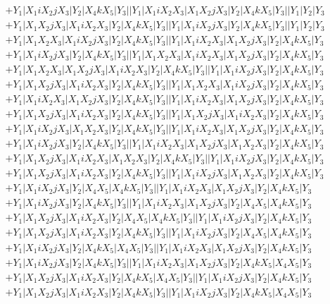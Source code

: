 \documentclass{article}[12pt]
\begin{document}
\begin{align*}
 & +Y_1|X_1iX_2jX_3|Y_2|X_4kX_5|Y_3||Y_1|X_1iX_2X_3|X_1X_2jX_3|Y_2|X_4kX_5|Y_3||Y_1|Y_2|Y_3\\ 
 & +Y_1|X_1X_2jX_3|X_1iX_2X_3|Y_2|X_4kX_5|Y_3||Y_1|X_1iX_2jX_3|Y_2|X_4kX_5|Y_3||Y_1|Y_2|Y_3\\ 
 & +Y_1|X_1X_2X_3|X_1iX_2jX_3|Y_2|X_4kX_5|Y_3||Y_1|X_1iX_2X_3|X_1X_2jX_3|Y_2|X_4kX_5|Y_3\\ 
 & +Y_1|X_1iX_2jX_3|Y_2|X_4kX_5|Y_3||Y_1|X_1X_2X_3|X_1iX_2X_3|X_1X_2jX_3|Y_2|X_4kX_5|Y_3\\ 
 & +Y_1|X_1X_2X_3|X_1X_2jX_3|X_1iX_2X_3|Y_2|X_4kX_5|Y_3||Y_1|X_1iX_2jX_3|Y_2|X_4kX_5|Y_3\\ 
 & +Y_1|X_1X_2jX_3|X_1iX_2X_3|Y_2|X_4kX_5|Y_3||Y_1|X_1X_2X_3|X_1iX_2jX_3|Y_2|X_4kX_5|Y_3\\ 
 & +Y_1|X_1iX_2X_3|X_1X_2jX_3|Y_2|X_4kX_5|Y_3||Y_1|X_1iX_2X_3|X_1X_2jX_3|Y_2|X_4kX_5|Y_3\\ 
 & +Y_1|X_1X_2jX_3|X_1iX_2X_3|Y_2|X_4kX_5|Y_3||Y_1|X_1X_2jX_3|X_1iX_2X_3|Y_2|X_4kX_5|Y_3\\ 
 & +Y_1|X_1iX_2jX_3|X_1X_2X_3|Y_2|X_4kX_5|Y_3||Y_1|X_1iX_2X_3|X_1X_2jX_3|Y_2|X_4kX_5|Y_3\\ 
 & +Y_1|X_1iX_2jX_3|Y_2|X_4kX_5|Y_3||Y_1|X_1iX_2X_3|X_1X_2jX_3|X_1X_2X_3|Y_2|X_4kX_5|Y_3\\ 
 & +Y_1|X_1X_2jX_3|X_1iX_2X_3|X_1X_2X_3|Y_2|X_4kX_5|Y_3||Y_1|X_1iX_2jX_3|Y_2|X_4kX_5|Y_3\\ 
 & +Y_1|X_1X_2jX_3|X_1iX_2X_3|Y_2|X_4kX_5|Y_3||Y_1|X_1iX_2jX_3|X_1X_2X_3|Y_2|X_4kX_5|Y_3\\ 
 & +Y_1|X_1iX_2jX_3|Y_2|X_4X_5|X_4kX_5|Y_3||Y_1|X_1iX_2X_3|X_1X_2jX_3|Y_2|X_4kX_5|Y_3\\ 
 & +Y_1|X_1iX_2jX_3|Y_2|X_4kX_5|Y_3||Y_1|X_1iX_2X_3|X_1X_2jX_3|Y_2|X_4X_5|X_4kX_5|Y_3\\ 
 & +Y_1|X_1X_2jX_3|X_1iX_2X_3|Y_2|X_4X_5|X_4kX_5|Y_3||Y_1|X_1iX_2jX_3|Y_2|X_4kX_5|Y_3\\ 
 & +Y_1|X_1X_2jX_3|X_1iX_2X_3|Y_2|X_4kX_5|Y_3||Y_1|X_1iX_2jX_3|Y_2|X_4X_5|X_4kX_5|Y_3\\ 
 & +Y_1|X_1iX_2jX_3|Y_2|X_4kX_5|X_4X_5|Y_3||Y_1|X_1iX_2X_3|X_1X_2jX_3|Y_2|X_4kX_5|Y_3\\ 
 & +Y_1|X_1iX_2jX_3|Y_2|X_4kX_5|Y_3||Y_1|X_1iX_2X_3|X_1X_2jX_3|Y_2|X_4kX_5|X_4X_5|Y_3\\ 
 & +Y_1|X_1X_2jX_3|X_1iX_2X_3|Y_2|X_4kX_5|X_4X_5|Y_3||Y_1|X_1iX_2jX_3|Y_2|X_4kX_5|Y_3\\ 
 & +Y_1|X_1X_2jX_3|X_1iX_2X_3|Y_2|X_4kX_5|Y_3||Y_1|X_1iX_2jX_3|Y_2|X_4kX_5|X_4X_5|Y_3\end{align*}
 
 
\end{document}
